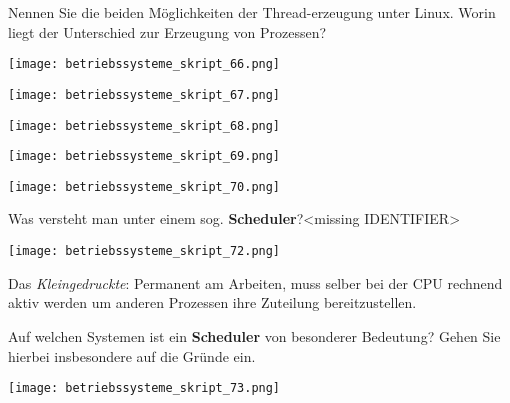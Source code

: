 \documentclass{article}
\begin{document}
\begin{tcolorbox}[colback=white!10!white,colframe=lightgray!75!black,
  savelowerto=\jobname_ex.tex,breakable,enhanced,lines before break=40]

\justifying
Nennen Sie die beiden Möglichkeiten der Thread-erzeugung unter Linux. Worin liegt der Unterschied zur Erzeugung von Prozessen?

\tcblower

\justifying
\begin{center}
\texttt{[image: betriebssysteme\_skript\_66.png]}
\end{center}
\begin{center}
\texttt{[image: betriebssysteme\_skript\_67.png]}
\end{center}
\begin{center}
\texttt{[image: betriebssysteme\_skript\_68.png]}
\end{center}
\begin{center}
\texttt{[image: betriebssysteme\_skript\_69.png]}
\end{center}
\begin{center}
\texttt{[image: betriebssysteme\_skript\_70.png]}
\end{center}

\end{tcolorbox}
\begin{tcolorbox}[colback=white!10!white,colframe=lightgray!75!black,
  savelowerto=\jobname_ex.tex,breakable,enhanced,lines before break=40]

\justifying
Was versteht man unter einem sog. \textbf{Scheduler}?<missing IDENTIFIER>

\tcblower

\justifying
\begin{center}
\texttt{[image: betriebssysteme\_skript\_72.png]}
\end{center}
Das \textit{Kleingedruckte}: Permanent am Arbeiten, muss selber bei der CPU rechnend aktiv werden um anderen Prozessen ihre Zuteilung bereitzustellen.
\end{tcolorbox}
\begin{tcolorbox}[colback=white!10!white,colframe=lightgray!75!black,
  savelowerto=\jobname_ex.tex,breakable,enhanced,lines before break=40]

\justifying
Auf welchen Systemen ist ein \textbf{Scheduler} von besonderer Bedeutung? Gehen Sie hierbei insbesondere auf die Gründe ein.

\tcblower

\justifying
\begin{center}
\texttt{[image: betriebssysteme\_skript\_73.png]}
\end{center}

\end{tcolorbox}
\end{document}
